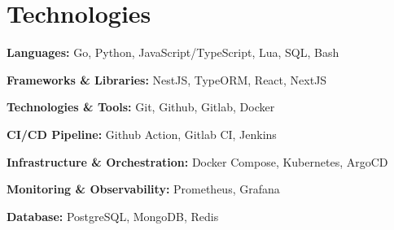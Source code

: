 \section{Technologies}

\begin{onecolentry}
	\textbf{Languages:}
	Go,
	Python,
	JavaScript/TypeScript,
	Lua,
	SQL,
	Bash
\end{onecolentry}

\vspace{0.2 cm}

\begin{onecolentry}
	\textbf{Frameworks \& Libraries:}
	NestJS,
	TypeORM,
	React,
	NextJS
\end{onecolentry}

\vspace{0.2 cm}

\begin{onecolentry}
	\textbf{Technologies \& Tools:}
	Git,
	Github,
	Gitlab,
	Docker
\end{onecolentry}

\vspace{0.2 cm}

\begin{onecolentry}
	\textbf{CI/CD Pipeline:}
	Github Action,
	Gitlab CI,
	Jenkins
\end{onecolentry}

\vspace{0.2 cm}

\begin{onecolentry}
	\textbf{Infrastructure \& Orchestration:}
	Docker Compose,
	Kubernetes,
	ArgoCD
\end{onecolentry}

\vspace{0.2 cm}

\begin{onecolentry}
	\textbf{Monitoring \& Observability:}
	Prometheus,
	Grafana
\end{onecolentry}

%
%
%

\vspace{0.2 cm}

\begin{onecolentry}
	\textbf{Database:}
	PostgreSQL,
	MongoDB,
	Redis
\end{onecolentry}
